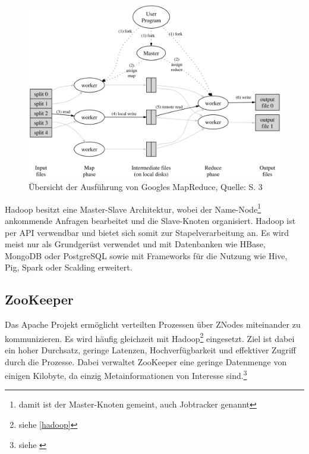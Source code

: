 \begin{figure}[h]
\centering
\includegraphics[width=\textwidth]{Abbildungen/mapreduce.png}
\caption[Übersicht der Ausführung von Googles MapReduce]{Übersicht der Ausführung von Googles MapReduce, Quelle: \cite{paper:mapreduce} S. 3}
\label{fig:mapreduce}
\end{figure}

Hadoop besitzt eine Master-Slave Architektur, wobei der Name-Node\footnote{damit ist der Master-Knoten gemeint, auch Jobtracker genannt} ankommende Anfragen bearbeitet und die Slave-Knoten organisiert.
Hadoop ist per API verwendbar und bietet sich somit zur Stapelverarbeitung an. %
Es wird meist nur als Grundgerüst verwendet und mit Datenbanken wie HBase, MongoDB oder PostgreSQL sowie mit Frameworks für die Nutzung wie Hive, Pig, Spark oder Scalding erweitert.


\subsection{ZooKeeper}
\label{zookeeper}
Das Apache Projekt  ermöglicht verteilten Prozessen über ZNodes miteinander zu kommunizieren.
Es wird häufig gleichzeit mit Hadoop\footnote{siehe \ref{hadoop}} eingesetzt.
Ziel ist dabei ein hoher Durchsatz, geringe Latenzen, Hochverfügbarkeit und effektiver Zugriff durch die Prozesse.
Dabei verwaltet ZooKeeper eine geringe Datenmenge von einigen Kilobyte, da einzig Metainformationen von Interesse sind.\footnote{siehe \cite{website:zookeeper}} 



